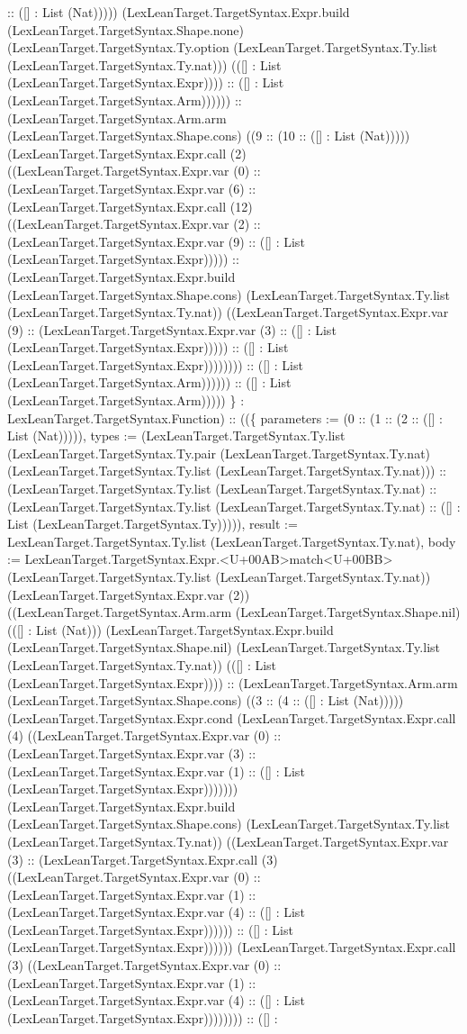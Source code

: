 \documentclass[11pt]{article}
\begin{document}
:: ([] : List (Nat))))) (LexLeanTarget.TargetSyntax.Expr.build (LexLeanTarget.TargetSyntax.Shape.none) (LexLeanTarget.TargetSyntax.Ty.option (LexLeanTarget.TargetSyntax.Ty.list (LexLeanTarget.TargetSyntax.Ty.nat))) (([] : List (LexLeanTarget.TargetSyntax.Expr)))) :: ([] : List (LexLeanTarget.TargetSyntax.Arm)))))) :: (LexLeanTarget.TargetSyntax.Arm.arm (LexLeanTarget.TargetSyntax.Shape.cons) ((9 :: (10 :: ([] : List (Nat))))) (LexLeanTarget.TargetSyntax.Expr.call (2) ((LexLeanTarget.TargetSyntax.Expr.var (0) :: (LexLeanTarget.TargetSyntax.Expr.var (6) :: (LexLeanTarget.TargetSyntax.Expr.call (12) ((LexLeanTarget.TargetSyntax.Expr.var (2) :: (LexLeanTarget.TargetSyntax.Expr.var (9) :: ([] : List (LexLeanTarget.TargetSyntax.Expr))))) :: (LexLeanTarget.TargetSyntax.Expr.build (LexLeanTarget.TargetSyntax.Shape.cons) (LexLeanTarget.TargetSyntax.Ty.list (LexLeanTarget.TargetSyntax.Ty.nat)) ((LexLeanTarget.TargetSyntax.Expr.var (9) :: (LexLeanTarget.TargetSyntax.Expr.var (3) :: ([] : List (LexLeanTarget.TargetSyntax.Expr))))) :: ([] : List (LexLeanTarget.TargetSyntax.Expr)))))))) :: ([] : List (LexLeanTarget.TargetSyntax.Arm)))))) :: ([] : List (LexLeanTarget.TargetSyntax.Arm))))) \} : LexLeanTarget.TargetSyntax.Function) :: ((\{ parameters := (0 :: (1 :: (2 :: ([] : List (Nat))))), types := (LexLeanTarget.TargetSyntax.Ty.list (LexLeanTarget.TargetSyntax.Ty.pair (LexLeanTarget.TargetSyntax.Ty.nat) (LexLeanTarget.TargetSyntax.Ty.list (LexLeanTarget.TargetSyntax.Ty.nat))) :: (LexLeanTarget.TargetSyntax.Ty.list (LexLeanTarget.TargetSyntax.Ty.nat) :: (LexLeanTarget.TargetSyntax.Ty.list (LexLeanTarget.TargetSyntax.Ty.nat) :: ([] : List (LexLeanTarget.TargetSyntax.Ty))))), result := LexLeanTarget.TargetSyntax.Ty.list (LexLeanTarget.TargetSyntax.Ty.nat), body := LexLeanTarget.TargetSyntax.Expr.<U+00AB>match<U+00BB> (LexLeanTarget.TargetSyntax.Ty.list (LexLeanTarget.TargetSyntax.Ty.nat)) (LexLeanTarget.TargetSyntax.Expr.var (2)) ((LexLeanTarget.TargetSyntax.Arm.arm (LexLeanTarget.TargetSyntax.Shape.nil) (([] : List (Nat))) (LexLeanTarget.TargetSyntax.Expr.build (LexLeanTarget.TargetSyntax.Shape.nil) (LexLeanTarget.TargetSyntax.Ty.list (LexLeanTarget.TargetSyntax.Ty.nat)) (([] : List (LexLeanTarget.TargetSyntax.Expr)))) :: (LexLeanTarget.TargetSyntax.Arm.arm (LexLeanTarget.TargetSyntax.Shape.cons) ((3 :: (4 :: ([] : List (Nat))))) (LexLeanTarget.TargetSyntax.Expr.cond (LexLeanTarget.TargetSyntax.Expr.call (4) ((LexLeanTarget.TargetSyntax.Expr.var (0) :: (LexLeanTarget.TargetSyntax.Expr.var (3) :: (LexLeanTarget.TargetSyntax.Expr.var (1) :: ([] : List (LexLeanTarget.TargetSyntax.Expr))))))) (LexLeanTarget.TargetSyntax.Expr.build (LexLeanTarget.TargetSyntax.Shape.cons) (LexLeanTarget.TargetSyntax.Ty.list (LexLeanTarget.TargetSyntax.Ty.nat)) ((LexLeanTarget.TargetSyntax.Expr.var (3) :: (LexLeanTarget.TargetSyntax.Expr.call (3) ((LexLeanTarget.TargetSyntax.Expr.var (0) :: (LexLeanTarget.TargetSyntax.Expr.var (1) :: (LexLeanTarget.TargetSyntax.Expr.var (4) :: ([] : List (LexLeanTarget.TargetSyntax.Expr)))))) :: ([] : List (LexLeanTarget.TargetSyntax.Expr)))))) (LexLeanTarget.TargetSyntax.Expr.call (3) ((LexLeanTarget.TargetSyntax.Expr.var (0) :: (LexLeanTarget.TargetSyntax.Expr.var (1) :: (LexLeanTarget.TargetSyntax.Expr.var (4) :: ([] : List (LexLeanTarget.TargetSyntax.Expr)))))))) :: ([] : 
\end{document}
